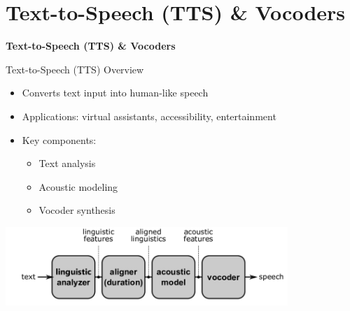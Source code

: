 \section{Text-to-Speech (TTS) \& Vocoders}

\begin{frame}{}
    \LARGE \textbf{Text-to-Speech (TTS) \& Vocoders}
\end{frame}

\begin{frame}[allowframebreaks]{Text-to-Speech (TTS) Overview}
    \begin{itemize}
        \item Converts text input into human-like speech
        \item Applications: virtual assistants, accessibility, entertainment
        \item Key components:
        \begin{itemize}
            \item Text analysis
            \item Acoustic modeling
            \item Vocoder synthesis
        \end{itemize}
    \end{itemize}
    \begin{center}
        \includegraphics[width=0.8\textwidth,height=0.9\textheight,keepaspectratio]{images/audio-nlp/tts_pipeline.png}
    \end{center}
\end{frame}

